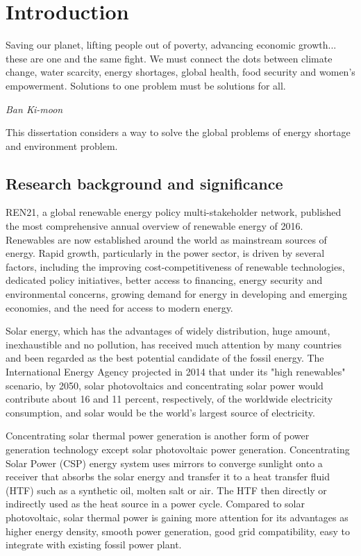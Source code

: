 \chapter{Introduction}\label{chapter:Introduction}
\epigraph{Saving our planet, lifting people out of poverty, advancing economic growth... these are one and the same fight. We must connect the dots between climate change, water scarcity, energy shortages, global health, food security and women's empowerment. Solutions to one problem must be solutions for all.}{\textit{Ban Ki-moon}}

This dissertation considers a way to solve the global problems of energy shortage and environment problem.

\section{Research background and significance}

REN21, a global renewable energy policy multi-stakeholder network, published the most comprehensive annual overview of renewable energy of 2016.~\cite{REN21}
Renewables are now established around the world as mainstream sources of energy. Rapid growth, particularly in the power sector, is driven by several factors, including the improving cost-competitiveness of renewable technologies, dedicated policy initiatives, better access to financing, energy security and environmental concerns, growing demand for energy in developing and emerging economies, and the need for access to modern energy.

Solar energy, which has the advantages of widely distribution, huge amount, inexhaustible and no pollution, has received much attention by many countries and been regarded as the best potential candidate of the fossil energy. The International Energy Agency projected in 2014 that under its "high renewables" scenario, by 2050, solar photovoltaics and concentrating solar power would contribute about 16 and 11 percent, respectively, of the worldwide electricity consumption, and solar would be the world's largest source of electricity.~\cite{IEA2014}

Concentrating solar thermal power generation is another form of power generation technology except solar photovoltaic power generation. Concentrating Solar Power (CSP) energy system uses mirrors to converge sunlight onto a receiver that absorbs the solar energy and transfer it to a heat transfer fluid (HTF) such as a synthetic oil, molten salt or air. The HTF then directly or indirectly used as the heat source in a power cycle.
Compared to solar photovoltaic, solar thermal power is gaining more attention for its advantages as higher energy density, smooth power generation, good grid compatibility, easy to integrate with existing fossil power plant.

